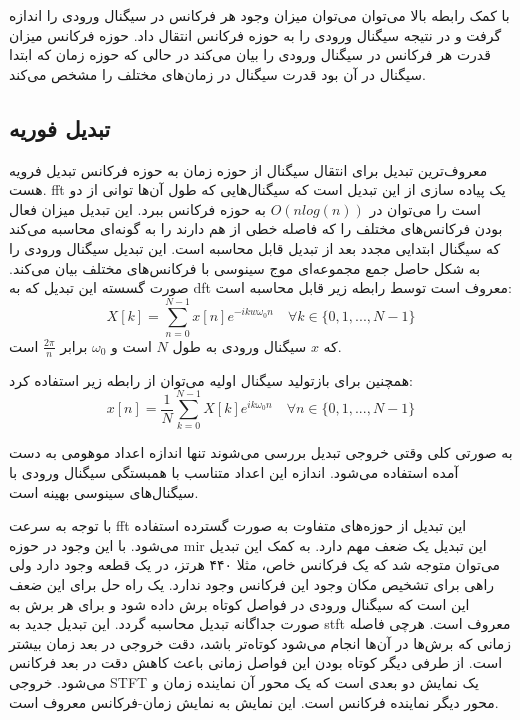 با کمک رابطه بالا می‌توان می‌توان میزان وجود هر فرکانس در سیگنال ورودی را اندازه
گرفت و در نتیجه سیگنال ورودی را به حوزه فرکانس انتقال داد. حوزه فرکانس میزان
قدرت هر فرکانس در سیگنال ورودی را بیان می‌کند در حالی که حوزه زمان که ابتدا سیگنال
در آن بود قدرت سیگنال در زمان‌های مختلف را مشخص می‌کند.

\subsection{تبدیل فوریه}
معروف‌ترین تبدیل برای انتقال سیگنال از حوزه زمان به حوزه فرکانس تبدیل فرویه هست.
\gls{fft} یک پیاده سازی از این تبدیل است که سیگنال‌هایی که طول آن‌ها توانی از دو
است را می‌توان در $O(nlog(n))$ به حوزه فرکانس ببرد. این تبدیل میزان فعال بودن
فرکانس‌های مختلف را که فاصله خطی از هم دارند را به گونه‌ای محاسبه می‌کند که
سیگنال ابتدایی مجدد بعد از تبدیل قابل محاسبه است. این تبدیل سیگنال ورودی را به
شکل حاصل جمع مجموعه‌ای موج سینوسی با فرکانس‌های مختلف بیان می‌کند. صورت گسسته
این تبدیل که به \gls{dft} معروف است توسط رابطه زیر قابل محاسبه است:
\begin{equation}
    X[k] = \sum_{n=0}^{N-1} x[n]e^{- ikw\omega_0n} \quad \forall k \in \{ 0, 1, ..., N-1 \}
\end{equation}
که $x$ سیگنال ورودی به طول $N$ است و $\omega_0$ برابر $\frac{2\pi}{n}$ است.

همچنین برای بازتولید سیگنال اولیه می‌توان از رابطه زیر استفاده کرد:
\begin{equation}
    x[n] = \frac{1}{N}\sum_{k=0}^{N-1} X[k]e^{ik\omega_0n} \quad \forall n \in \{ 0, 1, ..., N-1 \}
\end{equation}

به صورتی کلی وقتی خروجی تبدیل بررسی می‌شوند تنها اندازه اعداد موهومی به دست آمده
استفاده می‌شود. اندازه این اعداد متناسب با همبستگی سیگنال ورودی با سیگنال‌های
سینوسی بهینه است.

با توجه به سرعت \gls{fft} این تبدیل از حوزه‌های متفاوت به صورت گسترده استفاده
می‌شود. با این وجود در حوزه \gls{mir} این تبدیل یک ضعف مهم دارد. به کمک این
تبدیل می‌توان متوجه شد که یک فرکانس خاص، مثلا ۴۴۰ هرتز، در یک قطعه وجود دارد ولی
راهی برای تشخیص مکان وجود این فرکانس وجود ندارد. یک راه حل برای این ضعف این است
که سیگنال ورودی در فواصل کوتاه برش داده شود و برای هر برش به صورت جداگانه تبدیل
محاسبه گردد. این تبدیل جدید به \gls{stft} معروف است. هرچی فاصله زمانی که برش‌ها
در آن‌ها انجام می‌شود کوتاه‌تر باشد، دقت خروجی در بعد زمان بیشتر است. از طرفی
دیگر کوتاه بودن این فواصل زمانی باعث کاهش دقت در بعد فرکانس می‌شود. خروجی
\gls{STFT} یک نمایش دو بعدی است که یک محور آن نماینده زمان و محور دیگر نماینده
فرکانس است. این نمایش به نمایش زمان-فرکانس معروف است.

